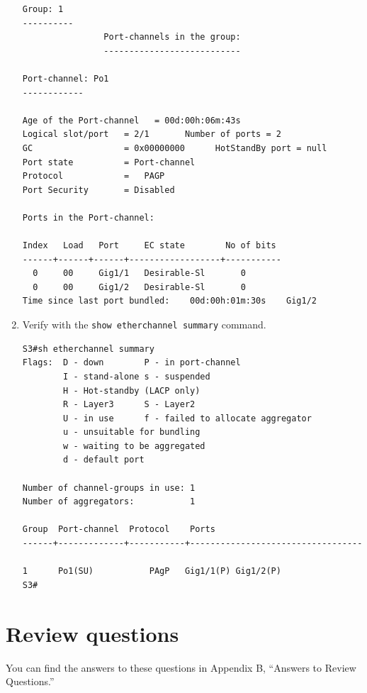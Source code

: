 \begin{enumerate}
\begin{verbatim}
Group: 1
----------
                Port-channels in the group:
                ---------------------------
 
Port-channel: Po1
------------
 
Age of the Port-channel   = 00d:00h:06m:43s
Logical slot/port   = 2/1       Number of ports = 2
GC                  = 0x00000000      HotStandBy port = null
Port state          = Port-channel
Protocol            =   PAGP
Port Security       = Disabled
 
Ports in the Port-channel:
 
Index   Load   Port     EC state        No of bits
------+------+------+------------------+-----------
  0     00     Gig1/1   Desirable-Sl       0
  0     00     Gig1/2   Desirable-Sl       0
Time since last port bundled:    00d:00h:01m:30s    Gig1/2
\end{verbatim}
\item
  Verify with the \texttt{show\ etherchannel\ summary} command.

\begin{verbatim}
S3#sh etherchannel summary
Flags:  D - down        P - in port-channel
        I - stand-alone s - suspended
        H - Hot-standby (LACP only)
        R - Layer3      S - Layer2
        U - in use      f - failed to allocate aggregator
        u - unsuitable for bundling
        w - waiting to be aggregated
        d - default port
 
Number of channel-groups in use: 1
Number of aggregators:           1
 
Group  Port-channel  Protocol    Ports
------+-------------+-----------+----------------------------------
 
1      Po1(SU)           PAgP   Gig1/1(P) Gig1/2(P)
S3#
\end{verbatim}
\end{enumerate}

\section{Review questions}

You can find the answers to these questions in Appendix B, ``Answers to Review Questions.''

